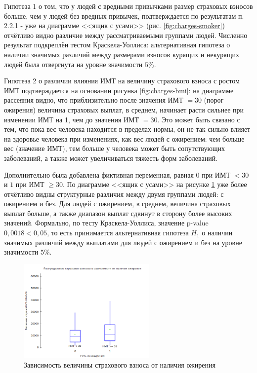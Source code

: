 \documentclass[a4paper,12pt]{article}
\begin{document}
Гипотеза 1 о том, что у людей с вредными привычками размер страховых взносов больше, чем у людей без вредных привычек, подтверждается по результатам п. 2.2.1 - уже на диаграмме <<ящик с усами>> (рис. \ref{fig:charges-smoker}) отчётливо видно различие между рассматриваемыми группами людей. Численно результат подкреплён тестом Краскела-Уоллиса: альтернативная гипотеза о наличии значимых различий между размерами взносов курящих и некурящих людей была отвергнута на уровне значимости $5\%$.

Гипотеза 2 о различии влияния ИМТ на величину страхового взноса с ростом ИМТ подтверждается на основании рисунка \ref{fig:charges-bmi}: на диаграмме рассеяния видно, что приблизительно после значения ИМТ $= 30$ (порог ожирения) величина страховых выплат, в среднем, начинает расти сильнее при изменении ИМТ на 1, чем до значения ИМТ $= 30$. Это может быть связано с тем, что пока вес человека находится в пределах нормы, он не так сильно влияет на здоровье человека при изменениях, как вес людей с ожирением: чем больше вес (значение ИМТ), тем больше у человека может быть сопутствующих заболеваний, а также может увеличиваться тяжесть форм заболеваний.

Дополнительно была добавлена фиктивная переменная, равная $0$ при ИМТ $<30$ и $1$ при ИМТ $\ge30$. По диаграмме <<ящик с усами>> на рисунке \ref{fig:is_fat} уже более отчётливо видны структурные различия между двумя группами людей: с ожирением и без. Для людей с ожирением, в среднем, величина страховых выплат больше, а также диапазон выплат сдвинут в сторону более высоких значений. Формально, по тесту Краскела-Уоллиса, значение p-value $0,0018 < 0,05$, то есть принимается альтернативная гипотеза $H_1$ о наличии значимых различий между выплатами для людей с ожирением и без на уровне значимости $5\%.$

\begin{figure}[H]
	\includegraphics[width=0.6\textwidth]{../[graphics]/is_fat.png}
	\centering
	\caption{Зависимость величины страхового взноса от наличия ожирения}
	\label{fig:is_fat}
\end{figure}
\end{document}
